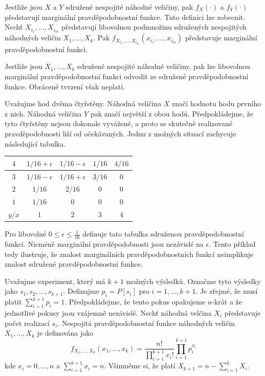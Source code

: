 \begin{definition}
Jestliže jsou $X$ a $Y$ sdružené nespojité náhodné veličiny, pak $f_X(\cdot)$ a $f_Y(\cdot)$ představují marginální pravděpodobnostní funkce. Tuto definici lze zobecnit. Nechť $X_{i_1}, ..., X_{i_m}$ představují libovolnou podmnožinu sdružených nespojitých náhodných veličin $X_1, ..., X_k$. Pak $f_{X_{i_1}, ..., X_{i_m}}(x_{i_1}, ..., x_{i_m})$ představuje marginální pravděpodobnostní funkci. 
\end{definition}

Jestliže jsou $X_1, ..., X_k$ sdružené nespojité náhodné veličiny, pak lze libovolnou marginální pravděpodobnostní funkci odvodit ze sdružené pravděpodobnostní funkce. Obrácené tvrzení však neplatí.

\begin{example}
Uvažujme hod dvěma čtyřstěny. Náhodná veličina $X$ značí hodnotu hodu prvního z nich. Náhodná veličina $Y$ pak značí největší z obou hodů. Předpokládejme, že tyto čtyřstěny nejsou dokonale vyvážené, a proto se skutečně realizované pravděpodobnosti liší od očekávaných. Jednu z možných situací zachycuje následující tabulka.
\begin{center}
  \begin{tabular}{|c|c|c|c|c|}
    \hline
    $4$ & $1/16 + \epsilon$ &  $1/16 - \epsilon$ & $1/16$ & $4/16$\\
    \hline
    $3$ & $1/16 - \epsilon$ &  $1/16 + \epsilon$ & $3/16$ & $0$\\
    \hline
    $2$ & $1/16$ &  $2/16$ & $0$ & $0$\\
    \hline
    $1$ & $1/16$ &  $0$ & $0$ & $0$\\
    \hline
    $y/x$ & $1$ & $2$ & $3$ & $4$\\
    \hline
  \end{tabular}
\end{center}
Pro libovolné $0 \le \epsilon \le \frac{1}{16}$ definuje tato tabulka sdruženou pravděpodobnostní funkci. Nicméně marginální pravděpodobnosti jsou nezávislé na $\epsilon$. Tento příklad tedy ilustruje, že znalost marginálních pravděpodobnostních funkcí neimplikuje znalost sdružené pravděpodobnostní funkce.
\end{example}

Uvažujme experiment, který má $k+1$ možných výsledků. Označme tyto výsledky jako $s_1, s_2, ...,s_{k+1}$. Definujme $p_i = P[s_i]$ pro $i = 1, ..., k+1$. Je zřejmé, že musí platit $\sum_{i = 1}^{k + 1}p_i = 1$. Předpokládejme, že tento pokus opakujeme $n$-krát a že jednotlivé pokusy jsou vzájemně nezávislé. Nechť náhodná velčina $X_i$ představuje počet realizací $s_i$. Nespojitá pravděpodobnostní funkce náhodných veličin $X_1, ..., X_k$ je definována jako
\begin{equation*}
f_{X_1, ..., X_k}(x_1, ..., x_k) = \frac{n!}{\prod_{i = 1}^{k + 1}x_i!}\prod_{i = 1}^{k + 1}p_i^{x_i}
\end{equation*}
kde $x_i = 0, ..., n$ a $\sum_{i = 1}^{k + 1} x_i = n$. Všimněme si, že platí $X_{k+1} = n - \sum_{i = 1}^k X_i$.

